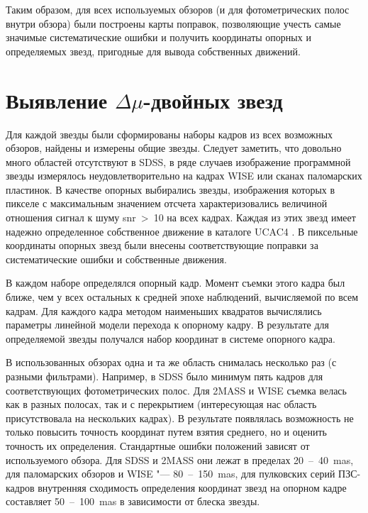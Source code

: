 Таким образом, для всех используемых обзоров (и для фотометрических полос внутри обзора) были построены карты поправок, позволяющие учесть самые значимые систематические ошибки и получить координаты опорных и определяемых звезд, пригодные для вывода собственных движений.
\section{Выявление $\Delta\mu$-двойных звезд} \label{sec:ch3/sect3}
Для каждой звезды были сформированы наборы кадров из всех возможных обзоров, найдены и измерены общие звезды. Следует заметить, что довольно много областей отсутствуют в SDSS, в ряде случаев изображение программной звезды измерялось неудовлетворительно на кадрах WISE или сканах паломарских пластинок. В качестве опорных выбирались звезды, изображения которых в пикселе с максимальным значением отсчета характеризовались величиной отношения сигнал к шуму snr~>~10 на всех кадрах. Каждая из этих звезд имеет надежно определенное собственное движение в каталоге UCAC4 \cite{2013AJ....145...44Z}. В пиксельные координаты опорных звезд были внесены соответствующие поправки за систематические ошибки и собственные движения.

В каждом наборе определялся опорный кадр. Момент съемки этого кадра был ближе, чем у всех остальных к средней эпохе наблюдений, вычисляемой по всем кадрам. Для каждого кадра методом наименьших квадратов вычислялись параметры линейной модели перехода к опорному кадру. В результате для определяемой звезды получался набор координат в системе опорного кадра.

В использованных обзорах одна и та же область снималась несколько раз (с разными фильтрами). Например, в SDSS было минимум пять кадров для соответствующих фотометрических полос. Для 2MASS и WISE съемка велась как в разных полосах, так и с перекрытием (интересующая нас область присутствовала на нескольких кадрах). В результате появлялась возможность не только повысить точность координат путем взятия среднего, но и оценить точность их определения. Стандартные ошибки положений зависят от используемого обзора. Для SDSS и 2MASS они лежат в пределах 20~--~40~mas, для паломарских обзоров и WISE "--- 80~--~150~mas, для пулковских серий ПЗС-кадров внутренняя сходимость определения координат звезд на опорном кадре составляет 50~--~100~mas в зависимости от блеска звезды.

